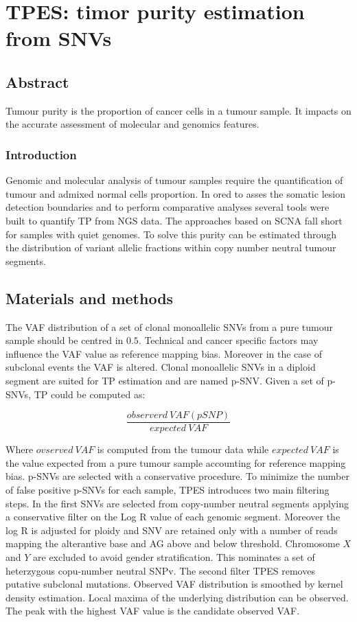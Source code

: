 \chapter{TPES: timor purity estimation from SNVs}

\section{Abstract}
Tumour purity is the proportion of cancer cells in a tumour sample.
It impacts on the accurate assessment of molecular and genomics features.

	\subsection{Introduction}
	Genomic and molecular analysis of tumour samples require the quantification of tumour and admixed normal cells proportion.
	In ored to asses the somatic lesion detection boundaries and to perform comparative analyses several tools were built to quantify TP from NGS data.
	The approaches based on SCNA fall short for samples with quiet genomes.
	To solve this purity can be estimated through the distribution of variant allelic fractions within copy number neutral tumour segments.

\section{Materials and methods}
The VAF distribution of a set of clonal monoallelic SNVs from a pure tumour sample should be centred in $0.5$.
Technical and cancer specific factors may influence the VAF value as reference mapping bias.
Moreover in the case of subclonal events the VAF is altered.
Clonal monoallelic SNVs in a diploid segment are suited for TP estimation and are named p-SNV.
Given a set of p-SNVs, TP could be computed as:

$$\frac{observerd\ VAF(pSNP)}{expected\ VAF}$$

Where $ovserved\ VAF$ is computed from the tumour data while $expected\ VAF$ is the value expected from a pure tumour sample accounting for reference mapping bias.
p-SNVs are selected with a conservative procedure.
To minimize the number of false positive p-SNVs for each sample, TPES introduces two main filtering steps.
In the first SNVs are selected from copy-number neutral segments applying a conservative filter on the Log R value of each genomic segment.
Moreover the log R is adjusted for ploidy and SNV are retained only with a number of reads mapping the alterantive base and AG above and below threshold.
Chromosome $X$ and $Y$ are excluded to avoid gender stratification.
This nominates a set of heterzygous copu-number neutral SNPv.
The second filter TPES removes putative subclonal mutations.
Observed VAF distribution is smoothed by kernel density estimation.
Local maxima of the underlying distribution can be observed.
The peak with the highest VAF value is the candidate observed VAF.
